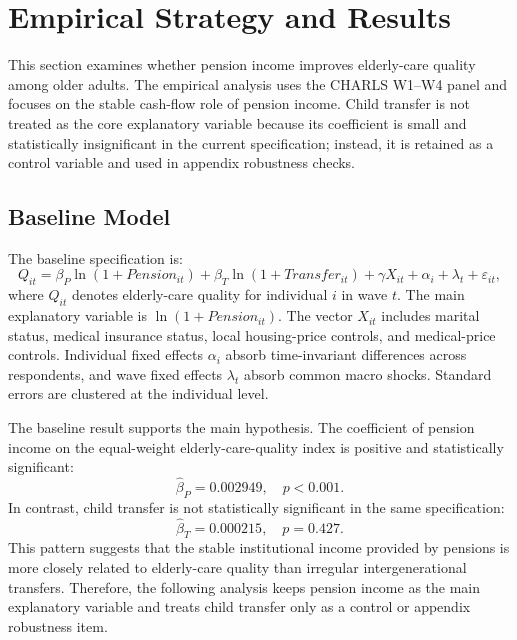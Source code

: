 
\section{Empirical Strategy and Results}

This section examines whether pension income improves elderly-care quality among older adults. The empirical analysis uses the CHARLS W1--W4 panel and focuses on the stable cash-flow role of pension income. Child transfer is not treated as the core explanatory variable because its coefficient is small and statistically insignificant in the current specification; instead, it is retained as a control variable and used in appendix robustness checks.

\subsection{Baseline Model}

The baseline specification is:
\begin{equation}
Q_{it}=\beta_P \ln(1+Pension_{it})+\beta_T \ln(1+Transfer_{it})+\gamma X_{it}+\alpha_i+\lambda_t+\varepsilon_{it},
\end{equation}
where \(Q_{it}\) denotes elderly-care quality for individual \(i\) in wave \(t\). The main explanatory variable is \(\ln(1+Pension_{it})\). The vector \(X_{it}\) includes marital status, medical insurance status, local housing-price controls, and medical-price controls. Individual fixed effects \(\alpha_i\) absorb time-invariant differences across respondents, and wave fixed effects \(\lambda_t\) absorb common macro shocks. Standard errors are clustered at the individual level.

The baseline result supports the main hypothesis. The coefficient of pension income on the equal-weight elderly-care-quality index is positive and statistically significant:
\[
\widehat{\beta}_P=0.002949,\quad p<0.001.
\]
In contrast, child transfer is not statistically significant in the same specification:
\[
\widehat{\beta}_T=0.000215,\quad p=0.427.
\]
This pattern suggests that the stable institutional income provided by pensions is more closely related to elderly-care quality than irregular intergenerational transfers. Therefore, the following analysis keeps pension income as the main explanatory variable and treats child transfer only as a control or appendix robustness item.

